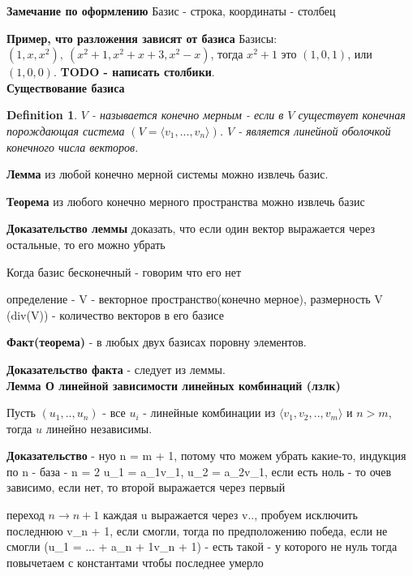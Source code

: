 \documentclass[12pt]{article}
\newtheorem{definition}{Definition}
\begin{document}
\textbf{Замечание по оформлению} Базис - строка, координаты - столбец

\textbf{Пример, что разложения зависят от базиса} Базисы: $(1, x, x^2),\ (x^2 + 1, x^2 + x + 3, x^2 - x)$, тогда $x^2 + 1$ это $(1, 0, 1)$, или $(1, 0, 0)$. \textbf{TODO - написать столбики}. \\


\textbf{Существование базиса}
\begin{definition}
    $V$ - называется конечно мерным - если в $V$ существует конечная порождающая система $(V=\langle v_1,...,v_n \rangle)$. $V$ - является линейной оболочкой конечного числа векторов.
\end{definition}

\textbf{Лемма} из любой конечно мерной системы можно извлечь базис.

\textbf{Теорема} из любого конечно мерного пространства можно извлечь базис

\textbf{Доказательство леммы} доказать, что если один вектор выражается через остальные, то его можно убрать 

Когда базис бесконечный - говорим что его нет

определение - V - векторное пространство(конечно мерное), размерность V (div(V)) - количество векторов в его базисе 


\textbf{Факт(теорема)} - в любых двух базисах поровну элементов. 

\textbf{Доказательство факта} - следует из леммы.
\\

\textbf{Лемма О линейной зависимости линейных комбинаций  (лзлк)}

Пусть $(u_1, .., u_n)$ - все $u_i$ - линейные комбинации из $\langle v_1, v_2, .. , v_m\rangle$ и $n > m$, тогда $u$ линейно независимы.

\textbf{Доказательство} - нуо n = m + 1, потому что можем убрать какие-то, индукция по n - база - n = 2 u_1 = a_1v_1, u_2 = a_2v_1, если есть ноль - то очев зависимо, если нет, то второй выражается через первый

переход $n \rightarrow n + 1$ каждая u выражается через v.., пробуем исключить последнюю v_{n + 1}, если смогли, тогда по предположению победа, если не смогли (u_1 = ... + a_{n + 1}v_{n + 1}) - есть такой - у которого не нуль тогда повычетаем с константами чтобы последнее умерло 
\end{document}
